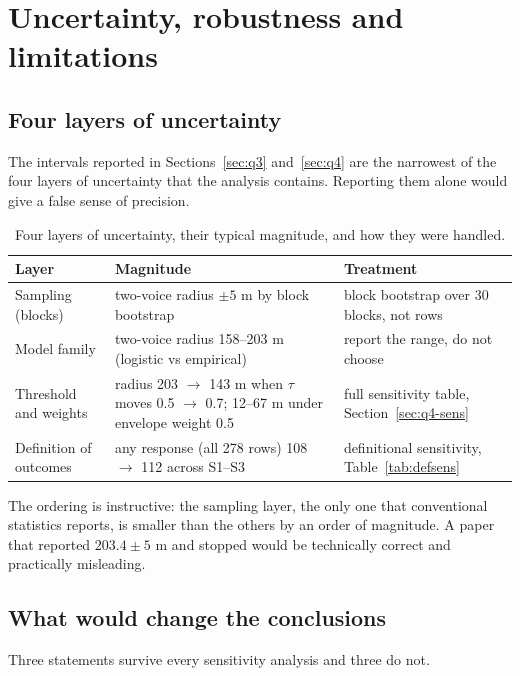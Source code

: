 \section{Uncertainty, robustness and limitations}\label{sec:discussion}

\subsection{Four layers of uncertainty}

The intervals reported in Sections~\ref{sec:q3} and~\ref{sec:q4} are the narrowest of the four
layers of uncertainty that the analysis contains. Reporting them alone would give a false sense
of precision.

\begin{table}[htbp]
  \centering
  \caption{Four layers of uncertainty, their typical magnitude, and how they were handled.}\label{tab:uncertainty}
  \small
  \begin{tabular}{p{2.6cm}p{4.6cm}p{5.6cm}}
    \toprule
    Layer & Magnitude & Treatment \\
    \midrule
    Sampling (blocks) & two-voice radius $\pm 5$ m by block bootstrap & block bootstrap over 30 blocks, not rows \\
    Model family & two-voice radius 158--203 m (logistic vs empirical) & report the range, do not choose \\
    Threshold and weights & radius 203 $\to$ 143 m when $\tau$ moves 0.5 $\to$ 0.7; 12--67 m under envelope weight 0.5 & full sensitivity table, Section~\ref{sec:q4-sens} \\
    Definition of outcomes & any response (all 278 rows) 108 $\to$ 112 across S1--S3 & definitional sensitivity, Table~\ref{tab:defsens} \\
    \bottomrule
  \end{tabular}
\end{table}

The ordering is instructive: the sampling layer, the only one that conventional statistics
reports, is smaller than the others by an order of magnitude. A paper that reported
$203.4\pm5$ m and stopped would be technically correct and practically misleading.

\subsection{What would change the conclusions}

Three statements survive every sensitivity analysis and three do not.

